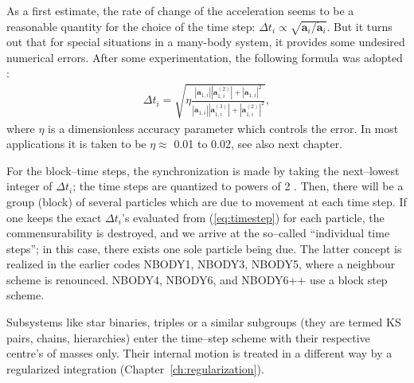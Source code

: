 As a first estimate, the rate of change of the acceleration
seems to be a reasonable quantity for the choice of the time
step:
$\Delta t_i \propto \sqrt{ \mathbf a_i / \dot{\mathbf a}_i }$.
But it turns out that for special situations in a many-body
system, it provides some undesired numerical errors.
After some experimentation, the following formula was adopted
\cite{a_85}:
%
\begin{eqnarray}
\Delta t_i = \sqrt{
           \eta \frac{|\mathbf a_{1,i}||\mathbf a_{1,i}^{(2)}| +
                      |\dot{\mathbf a}_{1,i}|^2 }
                     {|\dot{\mathbf a}_{1,i}||\mathbf a_{1,i}^{(3)}| +
                      |\mathbf a_{1,i}^{(2)}|^2 }
                  } ,    \label{eq:timestep}
\end{eqnarray}
%
where $\eta$ is a dimensionless accuracy parameter which
controls the error.
In most applications it is taken to be $\eta \approx$ 0.01
to 0.02, see also next chapter.

For the block--time steps, the synchronization is made
by taking the next--lowest integer of $\Delta t_i$;
the time steps are quantized to powers of 2 \cite{m_91a}.
Then, there will be a group (block) of several particles
which are due to movement at each time step.
If one keeps the exact $\Delta t_i$'s evaluated from
(\ref{eq:timestep}) for each particle, the commensurability
is destroyed, and we arrive at the so--called ``individual
time steps'';
in this case, there exists one sole particle being due.
The latter concept is realized in the earlier codes
NBODY1, NBODY3, NBODY5, where a neighbour scheme is renounced.
NBODY4, NBODY6, and NBODY6++ use a block step scheme.


Subsystems like star binaries, triples or a similar subgroups
(they are termed KS pairs, chains, hierarchies) enter the
time--step scheme with their respective centre's of masses only.
Their internal motion is treated in a different way by a
regularized integration (Chapter~\ref{ch:regularization}).


